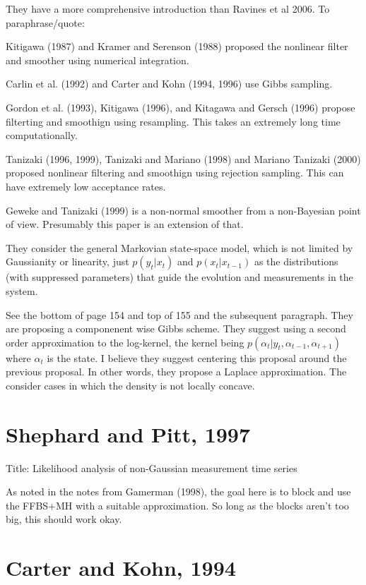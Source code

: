 \documentclass{article}
\begin{document}
They have a more comprehensive introduction than Ravines et al 2006.  To
paraphrase/quote:
\begin{outline}

\1 Kitigawa (1987) and Kramer and Serenson (1988) proposed the nonlinear
  filter and smoother using numerical integration.

\1 Carlin et al. (1992) and Carter and Kohn (1994, 1996) use Gibbs sampling.

\1 Gordon et al. (1993), Kitigawa (1996), and Kitagawa and Gersch (1996) propose
filterting and smoothign using resampling.  This takes an extremely long time
computationally.

\1 Tanizaki (1996, 1999), Tanizaki and Mariano (1998) and Mariano Tanizaki
(2000) proposed nonlinear filtering and smoothign using rejection sampling.
This can have extremely low acceptance rates.

\1 Geweke and Tanizaki (1999) is a non-normal smoother from a non-Bayesian point
of view.  Presumably this paper is an extension of that.

\end{outline}

They consider the general Markovian state-space model, which is not limited by
Gaussianity or linearity, just $p(y_t | x_t)$ and $p(x_t | x_{t-1})$ as the
distributions (with suppressed parameters) that guide the evolution and
measurements in the system.

See the bottom of page 154 and top of 155 and the subsequent paragraph.  They
are proposing a componenent wise Gibbs scheme.  They suggest using a second
order approximation to the log-kernel, the kernel being $p(\alpha_t | y_t,
\alpha_{t-1}, \alpha_{t+1})$ where $\alpha_t$ is the state.  I believe they
suggest centering this proposal around the previous proposal.  In other words,
they propose a Laplace approximation.  The consider cases in which the density
is not locally concave.

\section{Shephard and Pitt, 1997}

Title: Likelihood analysis of non-Gaussian measurement time series

As noted in the notes from Gamerman (1998), the goal here is to block and use
the FFBS+MH with a suitable approximation.  So long as the blocks aren't too
big, this should work okay.

\section{Carter and Kohn, 1994}
\end{document}
